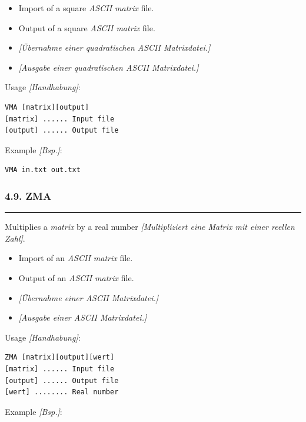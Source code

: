 \documentclass[
]{article}
\begin{document}
\begin{itemize}
\item
  Import of a square \emph{ASCII matrix} file.
\item
  Output of a square \emph{ASCII matrix} file.
\item
  \emph{{[}Übernahme einer quadratischen ASCII Matrixdatei.{]}}
\item
  \emph{{[}Ausgabe einer quadratischen ASCII Matrixdatei.{]}}
\end{itemize}

Usage \emph{{[}Handhabung{]}}:

\begin{verbatim}
VMA [matrix][output] 
[matrix] ...... Input file 
[output] ...... Output file
\end{verbatim}

Example \emph{{[}Bsp.{]}}:

\begin{verbatim}
VMA in.txt out.txt
\end{verbatim}

\hypertarget{zma}{%
\subsubsection{4.9. ZMA}\label{zma}}

\begin{center}\rule{0.5\linewidth}{0.5pt}\end{center}

Multiplies a \emph{matrix} by a real number \emph{{[}Multipliziert eine
Matrix mit einer reellen Zahl{]}}.

\begin{itemize}
\item
  Import of an \emph{ASCII matrix} file.
\item
  Output of an \emph{ASCII matrix} file.
\item
  \emph{{[}Übernahme einer ASCII Matrixdatei.{]}}
\item
  \emph{{[}Ausgabe einer ASCII Matrixdatei.{]}}
\end{itemize}

Usage \emph{{[}Handhabung{]}}:

\begin{verbatim}
ZMA [matrix][output][wert] 
[matrix] ...... Input file 
[output] ...... Output file 
[wert] ........ Real number
\end{verbatim}

Example \emph{{[}Bsp.{]}}:
\end{document}
